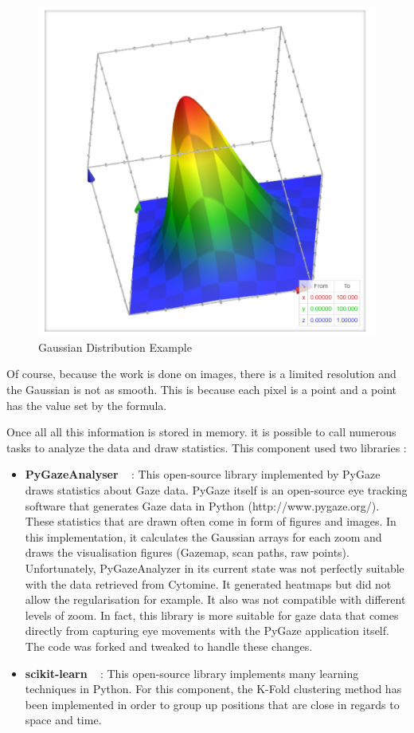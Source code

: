 \documentclass[a4paper,11pt]{report}
\numberwithin{figure}{chapter} %
\begin{document}
    \begin{figure}[H]
      \centering
      \includegraphics[width=.45\linewidth]{plots/gaussian2D.png}
      \caption{Gaussian Distribution Example}
      \label{fig:gaus22}
    \end{figure}

    Of course, because the work is done on images, there is a limited resolution and the Gaussian is not as smooth.
    This is because each pixel is a point and a point has the value set by the formula.
    \newline

    Once all all this information is stored in memory.
    it is possible to call numerous tasks to analyze the data and draw statistics.
    This component used two libraries :
    \begin{itemize}
        \item[\textbullet] \textbf{PyGazeAnalyser} ~\cite{pygaze} : This open-source library implemented by PyGaze draws statistics about Gaze data.
        PyGaze itself is an open-source eye tracking software that generates Gaze data in Python (http://www.pygaze.org/).
        These statistics that are drawn often come in form of figures and images.
        In this implementation, it calculates the Gaussian arrays for each zoom and draws the visualisation figures (Gazemap, scan paths, raw points).
        Unfortunately, PyGazeAnalyzer in its current state was not perfectly suitable with the data retrieved from Cytomine.
        It generated heatmaps but did not allow the regularisation for example.
        It also was not compatible with different levels of zoom.
        In fact, this library is more suitable for gaze data that comes directly from capturing eye movements with the PyGaze application itself.
        The code was forked and tweaked to handle these changes.
        \item[\textbullet] \textbf{scikit-learn} ~\cite{scikit-learn} : This open-source library implements many learning techniques in Python.
        For this component, the K-Fold clustering method has been implemented in order to group up positions that are close in regards to space and time.
    \end{itemize}
\end{document}
